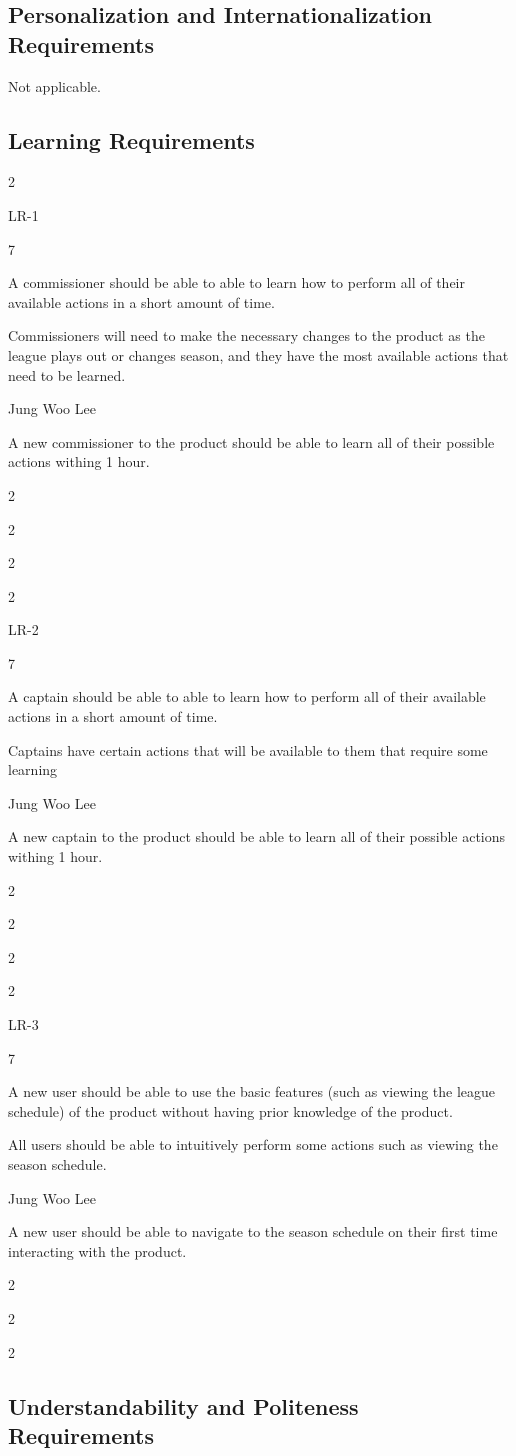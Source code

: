 \documentclass[12pt]{article}
\newenvironment{myreq}[1]{%
\setlist[description]{font=\normalfont\color{darkgray}}%
\begin{tcolorbox}[colframe=black,colback=white, sharp corners, boxrule=1pt]%
\bfseries\color{blue}%
\begin{description}#1}%
{\end{description}\end{tcolorbox}}
\newcommand{\twoinline}[2]{\begin{multicols}{2}#1 #2\end{multicols}}
\newcommand{\reqno}{\item[Requirement \#:]}
\newcommand{\reqevent}{\item[Event/BUC/PUC \#:]}
\newcommand{\reqdesc}{\item[Description:]}
\newcommand{\reqrat}{\item[Rationale:]}
\newcommand{\reqorig}{\item[Originator:]}
\newcommand{\reqfit}{\item[Fit Criterion:]}
\newcommand{\reqsatis}{\item[Customer Satisfaction:]}
\newcommand{\reqdissat}{\item[Customer Dissatisfaction:]}
\begin{document}
\subsection{Personalization and Internationalization Requirements}
Not applicable.

\subsection{Learning Requirements}

\begin{myreq}
  \twoinline
    {\reqno LR-1}
    {\reqevent 7}
  \reqdesc A commissioner should be able to able to learn how to perform all of
  their available actions in a short amount of time.
  \reqrat Commissioners will need to make the necessary changes to the 
  product as the league plays out or changes season, and they have the most
  available actions that need to be learned.
  \reqorig Jung Woo Lee
  \reqfit A new commissioner to the product should be able to learn all of their
  possible actions withing 1 hour.
  \twoinline
    {\reqsatis 2}
    {\reqdissat 2}
\end{myreq}

\begin{myreq}
  \twoinline
    {\reqno LR-2}
    {\reqevent 7}
  \reqdesc A captain should be able to able to learn how to perform all of
  their available actions in a short amount of time.
  \reqrat Captains have certain actions that will be available to them that
  require some learning
  \reqorig Jung Woo Lee
  \reqfit A new captain to the product should be able to learn all of their
  possible actions withing 1 hour.
  \twoinline
    {\reqsatis 2}
    {\reqdissat 2}
\end{myreq}

\begin{myreq}
  \twoinline
    {\reqno LR-3}
    {\reqevent 7}
  \reqdesc A new user should be able to use the basic features (such as viewing
  the league schedule) of the product without having prior knowledge of the product.
  \reqrat All users should be able to intuitively perform some actions such as 
  viewing the season schedule.
  \reqorig Jung Woo Lee
  \reqfit A new user should be able to navigate to the season schedule on
  their first time interacting with the product.
  \twoinline
    {\reqsatis 2}
    {\reqdissat 2}
\end{myreq}

\subsection{Understandability and Politeness Requirements}
\end{document}
